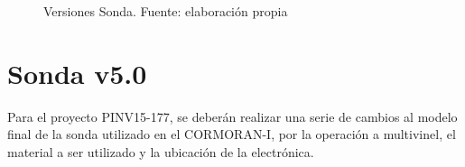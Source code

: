 \begin{figure}[htbp]
\centering
{}



\caption{Versiones Sonda. Fuente: elaboración propia} \label{fig:Sonda_Versiones}
\end{figure}

\section{Sonda v5.0}
Para el proyecto PINV15-177, se deberán realizar una serie de cambios al modelo final de la sonda utilizado en el CORMORAN-I, por la operación a multivinel, el material a ser utilizado y la ubicación de la electrónica.
